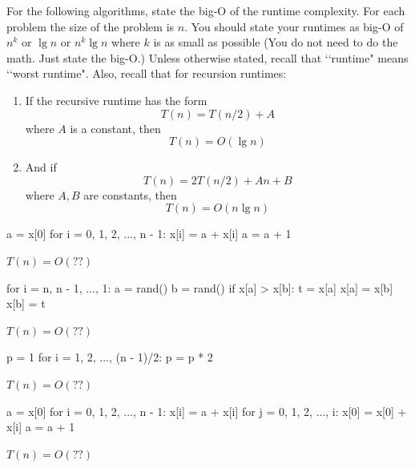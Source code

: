 

\LATEXHELPTHREEFIVEZERO

For the following algorithms, state the big-O of the runtime complexity.
For each problem the size of the problem is $n$.
You should state your runtimes as
big-O of $n^k$
or $\lg n$ or $n^k \lg n$
where $k$ is as small as possible
(You do not need to do the math. Just state the big-O.)
Unless otherwise stated, recall that \lq\lq runtime" means \lq\lq worst
runtime".
Also, recall that for recursion runtimes:
\begin{enumerate}[nosep]
\item If the recursive runtime has the form
\[
T(n) = T(n/2) + A
\]
where $A$ is a constant, then
\[
T(n) = O(\lg n)
\]
\item And if
\[
T(n) = 2T(n/2) + An + B
\]
where $A,B$ are constants, then
\[
T(n) = O(n \lg n)
\]
\end{enumerate}

\TURNPAGE
\newpage

\nextq
\begin{console}[fontsize=\small]
a = x[0]
for i = 0, 1, 2, ..., n - 1:
    x[i] = a + x[i]
    a = a + 1
\end{console}
\ANSWER
\begin{answerlong}
$T(n) = O(??)$
\end{answerlong}

\nextq
\begin{console}[fontsize=\small]
for i = n, n - 1, ..., 1:
    a = rand() %
    b = rand() %
    if x[a] > x[b]:
        t = x[a]
        x[a] = x[b]
        x[b] = t
\end{console}
\ANSWER
\begin{answerlong}
$T(n) = O(??)$
\end{answerlong}

\nextq
\begin{console}[fontsize=\small]
p = 1
for i = 1, 2, ..., (n - 1)/2:
    p = p * 2
\end{console}
\ANSWER
\begin{answerlong}
$T(n) = O(??)$
\end{answerlong}

\nextq
\begin{console}[fontsize=\small]
a = x[0]
for i = 0, 1, 2, ..., n - 1:
    x[i] = a + x[i]
    for j = 0, 1, 2, ..., i:
        x[0] = x[0] + x[i]
    a = a + 1
\end{console}
\ANSWER
\begin{answerlong}
$T(n) = O(??)$
\end{answerlong}


